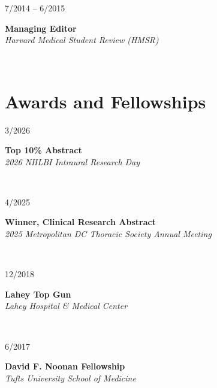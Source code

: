 \documentclass{article}
\newcommand\colleft{.20}
\newcommand\colright{.75}
\newcommand{\entryfour}[4]
	{
		\begin{minipage}[t]{\colleft\textwidth}
		\hfill \textsc{#1}
		\end{minipage}
		\hfill\vline\hfill
		\begin{minipage}[t]{\colright\textwidth}
		{\bf#2}\\
		\textit{#3}
		\footnotesize{#4}
		\end{minipage}\\
		\entryvspace
	}%
\newcommand{\entryvspace}{\vspace{0.5em}}
\begin{document}

	\entryfour{7/2014 -- 6/2015}{Managing Editor}{Harvard Medical Student Review (HMSR)}{%
	}

	\section*{Awards and Fellowships}
	\entryfour{3/2026}{Top 10\% Abstract}{2026 NHLBI Intraural Research Day}{}
	
	\entryfour{4/2025}{Winner, Clinical Research Abstract}{2025 Metropolitan DC Thoracic Society Annual Meeting}{%
	}
	
	\entryfour{12/2018}{Lahey Top Gun}{Lahey Hospital \& Medical Center}{%
		}
	
	\entryfour{6/2017}{David F. Noonan Fellowship}{Tufts University School of Medicine}{%
		}
	
\end{document}
